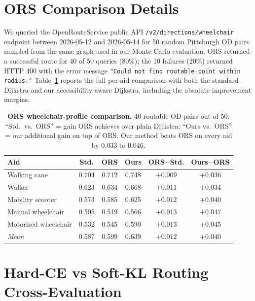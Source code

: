 \documentclass[conference]{IEEEtran}
\begin{document}
\FloatBarrier
\section{ORS Comparison Details}
\label{sec:supp_ors}

We queried the OpenRouteService public API \texttt{/v2/directions/wheelchair} endpoint between 2026-05-12 and 2026-05-14 for 50 random Pittsburgh OD pairs sampled from the same graph used in our Monte Carlo evaluation. ORS returned a successful route for 40 of 50 queries (80\%); the 10 failures (20\%) returned HTTP 400 with the error message \texttt{"Could not find routable point within radius."} Table~\ref{tab:supp_ors_full} reports the full per-aid comparison with both the standard Dijkstra and our accessibility-aware Dijkstra, including the absolute improvement margins.

\begin{table}[!t]
\caption{\textbf{ORS wheelchair-profile comparison.} 40 routable OD pairs out of 50. ``Std.\ vs.\ ORS'' = gain ORS achieves over plain Dijkstra; ``Ours vs.\ ORS'' = our additional gain on top of ORS. Our method beats ORS on every aid by 0.033 to 0.046.}
\label{tab:supp_ors_full}
\centering\scriptsize
\setlength{\tabcolsep}{3.5pt}
\begin{tabular}{@{}lccccc@{}}
\toprule
\textbf{Aid} & \textbf{Std.} & \textbf{ORS} & \textbf{Ours} & \textbf{ORS$-$Std.} & \textbf{Ours$-$ORS} \\
\midrule
Walking cane         & 0.704 & 0.712 & 0.748 & $+0.009$ & $\mathbf{+0.036}$ \\
Walker               & 0.623 & 0.634 & 0.668 & $+0.011$ & $\mathbf{+0.034}$ \\
Mobility scooter     & 0.573 & 0.585 & 0.625 & $+0.012$ & $\mathbf{+0.040}$ \\
Manual wheelchair    & 0.505 & 0.519 & 0.566 & $+0.013$ & $\mathbf{+0.047}$ \\
Motorized wheelchair & 0.532 & 0.545 & 0.590 & $+0.013$ & $\mathbf{+0.045}$ \\
\midrule
\textit{Mean}        & 0.587 & 0.599 & 0.639 & $+0.012$ & $\mathbf{+0.040}$ \\
\bottomrule
\end{tabular}
\end{table}

\FloatBarrier
\section{Hard-CE vs Soft-KL Routing Cross-Evaluation}
\label{sec:supp_hardce_routing}
\end{document}
